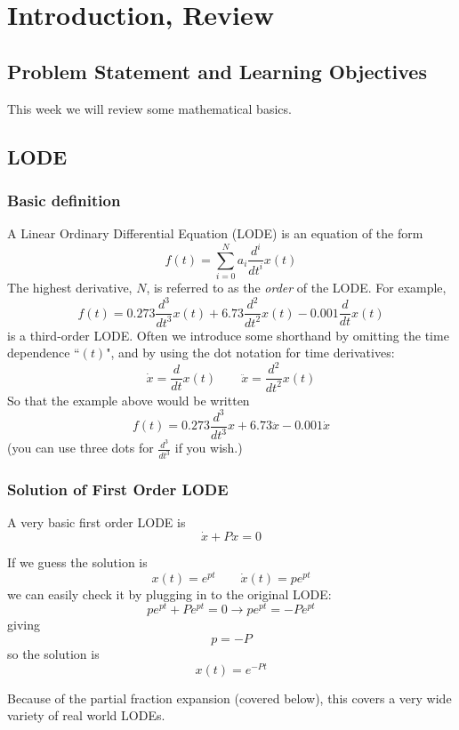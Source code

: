 %
%
%

\chapter{Introduction, Review}

\section{Problem Statement and Learning Objectives}

This week we will review some mathematical basics.

\section{LODE}
\subsection{Basic definition}

A Linear Ordinary Differential Equation (LODE) is an equation of the form
\[
f(t) = \sum_{i=0}^{N} a_i\frac{d^i}{dt^i}x(t)
\]
The highest derivative, $N$, is referred to as the {\it order} of the LODE.  For example,
\[
f(t) = 0.273\frac{d^3}{dt^3}x(t) + 6.73\frac{d^2}{dt^2}x(t) - 0.001\frac{d}{dt}x(t)
\]
is a third-order LODE.   Often we introduce some shorthand by omitting the time dependence ``$(t)$", and by using the dot notation for time derivatives:
\[
\dot{x} = \frac{d}{dt}x(t)  \qquad \ddot{x} = \frac{d^2}{dt^2}x(t)
\]
So that the example above would be written
\[
f(t) =0.273\frac{d^3}{dt^3}x + 6.73\ddot{x} - 0.001\dot{x}
\]
(you can use three dots for $\frac{d^3}{dt^3}$ if you wish.)


\subsection{Solution of First Order LODE}

A very basic  first order LODE is
\[
\dot{x} + Px = 0
\]

If we guess the solution is
\[
x(t) = e^{pt} \qquad \dot{x}(t) = pe^{pt}
\]
we can easily check it by plugging in to the original LODE:
\[
pe^{pt} +Pe^{pt} = 0 \to pe^{pt} = -Pe^{pt}
\]
giving
\[
p = -P
\]
so the solution is
\[
x(t) = e^{-Pt}
\]

Because of the partial fraction expansion (covered below), this covers a very wide variety of real world LODEs.


